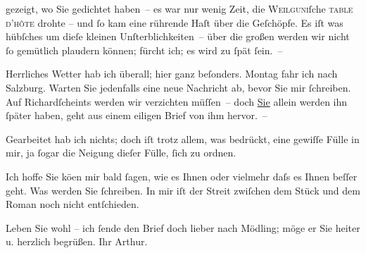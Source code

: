                gezeigt, wo Sie gedichtet haben – es war nur wenig Zeit, die \textsc{Weil{\pb}guni}ſche \textsc{table d’hôte} drohte – und{ }ſo kam eine rührende
               Haſt über die Geſchöpfe. Es iſt was hübſches um dieſe kleinen Unſterblichkeiten –
               über die großen werden wir nicht{ }ſo gemütlich plaudern können; fürcht ich; es wird zu{ }ſpät{ }ſein. –\pend
           
\pstart
           Herrliches Wetter hab ich überall; hier ganz beſonders. Montag fahr ich
               nach Salzburg. Warten Sie {\pb}jedenfalls eine neue Nachricht ab, bevor Sie mir{ }ſchreiben. Auf Richardſcheints werden wir verzichten müſſen – doch \uline{Sie}{ }\introOben{}allein\introOben{} werden ihn{ }ſpäter haben, geht aus einem eiligen Brief
               von ihm hervor. –\pend
           
\pstart
           Gearbeitet hab ich nichts; doch iſt trotz allem, was bedrückt, eine gewiſſe Fülle in
               mir, ja{ }ſogar die Neigung dieſer Fülle,{ }ſich zu {\pb}ordnen.\pend
           
\pstart
           Ich hoffe Sie kö{\geminationn}en mir bald{ }ſagen, wie es Ihnen \introOben{}oder vielmehr\introOben{} daſs es Ihnen beſſer geht. Was werden Sie{ }ſchreiben. In mir iſt der Streit zwiſchen dem Stück und dem Roman noch nicht entſchieden.\pend
           
\pstart
           Leben Sie wohl – ich{ }ſende den Brief doch lieber nach Mödling; möge er Sie heiter u. herzlich begrüßen.\pend
           \pstart Ihr \spacefill\mbox{Arthur.}\pend{}\endnumbering{}  \newcommand{\dateiname}{L00826}\newcommand{\titel}{Arthur Schnitzler an Hugo von Hofmannsthal, 23. 7. 1898}\newcommand{\editorInnen}{Martin Anton Müller und Gerd-Hermann Susen}
